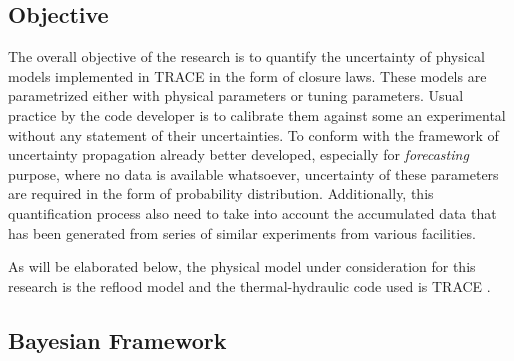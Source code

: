 \documentclass[11pt,titlepage]{article}
\begin{document}



\subsection{Objective}

The overall objective of the research is to quantify the uncertainty of physical models implemented in TRACE in the form of closure laws. 
These models are parametrized either with physical parameters or tuning parameters. 
Usual practice by the code developer is to calibrate them against some an experimental without any statement of their uncertainties. 
To conform with the framework of uncertainty propagation already better developed, especially for \emph{forecasting} purpose, where no data is available whatsoever, uncertainty of these parameters are required in the form of probability distribution. 
Additionally, this quantification process also need to take into account the accumulated data that has been generated from series of similar experiments from various facilities.

As will be elaborated below, the physical model under consideration for this research is the reflood model and the thermal-hydraulic code used is TRACE \cite{TraceTheory2012}.

\subsection{Bayesian Framework}
\end{document}
